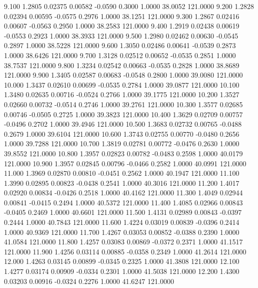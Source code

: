    9.100   1.2805   0.02375   0.00582  -0.0590   0.3000   1.0000  38.0052 121.0000
   9.200   1.2828   0.02394   0.00595  -0.0575   0.2976   1.0000  38.1251 121.0000
   9.300   1.2867   0.02416   0.00607  -0.0563   0.2950   1.0000  38.2583 121.0000
   9.400   1.2919   0.02438   0.00619  -0.0553   0.2923   1.0000  38.3933 121.0000
   9.500   1.2980   0.02462   0.00630  -0.0545   0.2897   1.0000  38.5228 121.0000
   9.600   1.3050   0.02486   0.00641  -0.0539   0.2873   1.0000  38.6426 121.0000
   9.700   1.3128   0.02512   0.00652  -0.0535   0.2851   1.0000  38.7537 121.0000
   9.800   1.3234   0.02542   0.00663  -0.0535   0.2828   1.0000  38.8689 121.0000
   9.900   1.3405   0.02587   0.00683  -0.0548   0.2800   1.0000  39.0080 121.0000
  10.000   1.3437   0.02610   0.00699  -0.0535   0.2784   1.0000  39.0877 121.0000
  10.100   1.3480   0.02635   0.00716  -0.0524   0.2766   1.0000  39.1775 121.0000
  10.200   1.3527   0.02660   0.00732  -0.0514   0.2746   1.0000  39.2761 121.0000
  10.300   1.3577   0.02685   0.00746  -0.0505   0.2725   1.0000  39.3823 121.0000
  10.400   1.3629   0.02709   0.00757  -0.0496   0.2702   1.0000  39.4946 121.0000
  10.500   1.3683   0.02732   0.00765  -0.0488   0.2679   1.0000  39.6104 121.0000
  10.600   1.3743   0.02755   0.00770  -0.0480   0.2656   1.0000  39.7288 121.0000
  10.700   1.3819   0.02781   0.00772  -0.0476   0.2630   1.0000  39.8552 121.0000
  10.800   1.3957   0.02823   0.00782  -0.0483   0.2598   1.0000  40.0179 121.0000
  10.900   1.3957   0.02845   0.00796  -0.0466   0.2582   1.0000  40.0991 121.0000
  11.000   1.3969   0.02870   0.00810  -0.0451   0.2562   1.0000  40.1947 121.0000
  11.100   1.3990   0.02895   0.00823  -0.0438   0.2541   1.0000  40.3016 121.0000
  11.200   1.4017   0.02920   0.00834  -0.0426   0.2518   1.0000  40.4162 121.0000
  11.300   1.4049   0.02944   0.00841  -0.0415   0.2494   1.0000  40.5372 121.0000
  11.400   1.4085   0.02966   0.00843  -0.0405   0.2469   1.0000  40.6601 121.0000
  11.500   1.4131   0.02989   0.00843  -0.0397   0.2444   1.0000  40.7843 121.0000
  11.600   1.4224   0.03019   0.00839  -0.0396   0.2414   1.0000  40.9369 121.0000
  11.700   1.4267   0.03053   0.00852  -0.0388   0.2390   1.0000  41.0584 121.0000
  11.800   1.4257   0.03083   0.00869  -0.0372   0.2371   1.0000  41.1517 121.0000
  11.900   1.4256   0.03114   0.00885  -0.0358   0.2349   1.0000  41.2614 121.0000
  12.000   1.4263   0.03145   0.00899  -0.0345   0.2325   1.0000  41.3808 121.0000
  12.100   1.4277   0.03174   0.00909  -0.0334   0.2301   1.0000  41.5038 121.0000
  12.200   1.4300   0.03203   0.00916  -0.0324   0.2276   1.0000  41.6247 121.0000
